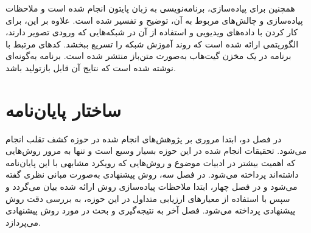 همچنین برای پیاده‌سازی، برنامه‌نویسی به زبان پایتون انجام شده است و ملاحظات پیاده‌سازی و چالش‌های مربوط به آن، توضیح و تفسیر شده است. علاوه بر این، برای کار کردن با داده‌های ویدیویی و استفاده از آن در شبکه‌هایی که ورودی تصویر دارند، الگوریتمی ارائه شده است که روند آموزش شبکه را تسریع ببخشد. کدهای مرتبط با برنامه در یک مخزن گیت‌هاب
 به‌صورت متن‌باز منتشر شده است. برنامه به‌گونه‌ای نوشته شده است که نتایج آن قابل بازتولید باشد.
\section{ساختار پایان‌نامه}
در فصل دو، ابتدا مروری بر پژوهش‌های انجام شده در حوزه کشف تقلب انجام می‌شود. تحقیقات انجام شده در این حوزه بسیار وسیع است و تنها به مرور روش‌هایی که اهمیت بیشتر در ادبیات موضوع و روش‌هایی که رویکرد مشابهی با این پایان‌نامه داشته‌اند پرداخته می‌شود. در فصل سه، روش پیشنهادی به‌صورت مبانی نظری گفته می‌شود و در فصل چهار، ابتدا ملاحظات پیاده‌سازی روش ارائه شده بیان می‌گردد و سپس با استفاده از معیارهای ارزیابی متداول در این حوزه، به بررسی دقت روش پیشنهادی پرداخته می‌شود. فصل آخر به نتیجه‌گیری و بحث در مورد روش پیشنهادی می‌پردازد.


